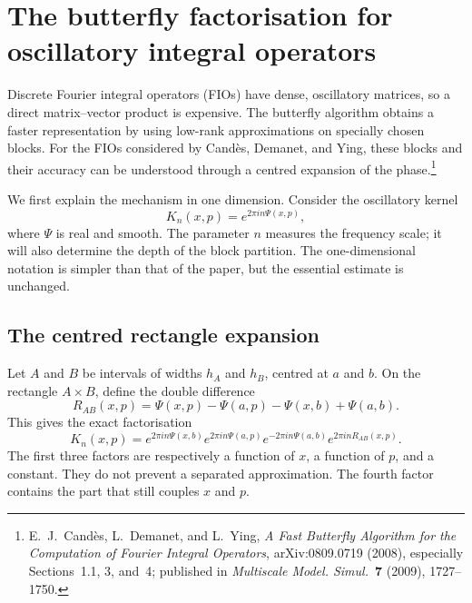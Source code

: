 \section{The butterfly factorisation for oscillatory integral operators}
\label{sec:butterfly}

Discrete Fourier integral operators (FIOs) have dense, oscillatory matrices, so a direct matrix--vector product is expensive. The butterfly algorithm obtains a faster representation by using low-rank approximations on specially chosen blocks. For the FIOs considered by Cand\`{e}s, Demanet, and Ying, these blocks and their accuracy can be understood through a centred expansion of the phase.\footnote{E.~J.~Cand\`{e}s, L.~Demanet, and L.~Ying, \emph{A Fast Butterfly Algorithm for the Computation of Fourier Integral Operators}, arXiv:0809.0719 (2008), especially Sections~1.1, 3, and~4; published in \emph{Multiscale Model. Simul.}~\textbf{7} (2009), 1727--1750.}

We first explain the mechanism in one dimension. Consider the oscillatory kernel
\begin{equation}
    K_n(x,p)=e^{2\pi i n\Psi(x,p)},
    \label{eq:scaled-kernel}
\end{equation}
where $\Psi$ is real and smooth. The parameter $n$ measures the frequency scale; it will also determine the depth of the block partition. The one-dimensional notation is simpler than that of the paper, but the essential estimate is unchanged.

\subsection{The centred rectangle expansion}

Let $A$ and $B$ be intervals of widths $h_A$ and $h_B$, centred at $a$ and $b$. On the rectangle $A\times B$, define the double difference
\begin{equation}
    R_{AB}(x,p)
    =\Psi(x,p)-\Psi(a,p)-\Psi(x,b)+\Psi(a,b).
    \label{eq:rectangle-remainder}
\end{equation}
This gives the exact factorisation
\begin{equation}
    K_n(x,p)
    =e^{2\pi i n\Psi(x,b)}
     e^{2\pi i n\Psi(a,p)}
     e^{-2\pi i n\Psi(a,b)}
     e^{2\pi i nR_{AB}(x,p)}.
    \label{eq:centered-factorisation}
\end{equation}
The first three factors are respectively a function of $x$, a function of $p$, and a constant. They do not prevent a separated approximation. The fourth factor contains the part that still couples $x$ and $p$.

